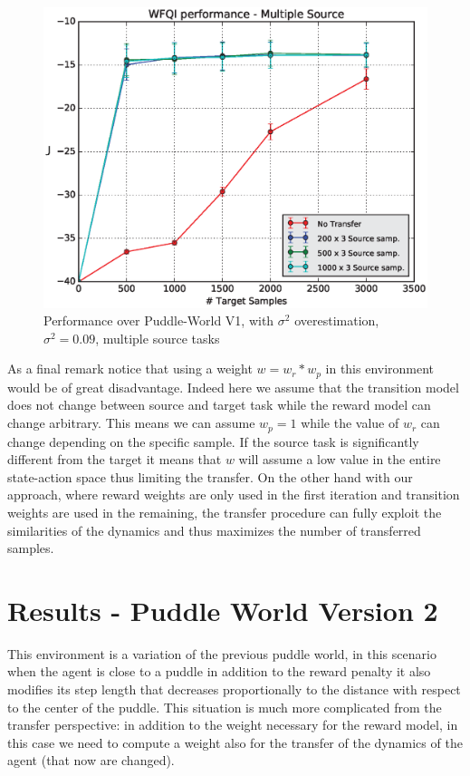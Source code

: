     \begin{figure}[H]
      \centering
      \includegraphics[scale=0.5]{images/WFQIPerfM_V1_MEAN2.eps}
      \caption{Performance over Puddle-World V1, with $\sigma^{2}$ overestimation, $\sigma^{2} = 0.09$, multiple source tasks}
      \label{}
    \end{figure}


    \noindent As a final remark notice that using a weight $w = w_r*w_p$ in this environment would be
    of great disadvantage. Indeed here we assume that the transition model does not change between
    source and target task while the reward model can change arbitrary. This means we can assume
    $w_p = 1$ while the value of $w_r$ can change depending on the specific sample. If the source task
    is significantly different from the target it means that $w$ will assume a low value in the entire
    state-action space thus limiting the transfer. On the other hand with our approach, where reward weights
    are only used in the first iteration and transition weights are used in the remaining, the transfer
    procedure can fully exploit the similarities of the dynamics and thus maximizes the number of transferred
    samples.


  \section{Results - Puddle World Version 2}
    \noindent This environment is a variation of the previous puddle world, in this scenario when the agent is
    close to a puddle in addition to the reward penalty it also modifies its step length that decreases
    proportionally to the distance with respect to the center of the puddle. This situation is much more
    complicated from the transfer perspective: in addition to the weight necessary for the reward model, in
    this case we need to compute a weight also for the transfer of the dynamics of the agent (that now are
    changed).

